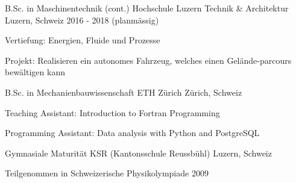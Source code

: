 

\begin{cventries}

\cventry
{B.Sc. in Maschinentechnik (cont.)} %
{Hochschule Luzern Technik \& Architektur} %
{Luzern, Schweiz} %
{2016 - 2018 (planmässig)} %
{
	\begin{cvitems} %
		\item {Vertiefung: Energien, Fluide und Prozesse}
		\item {Projekt: Realisieren ein autonomes Fahrzeug, welches einen Gelände-parcours bewältigen kann}
	\end{cvitems}
}


  \cventry
    {B.Sc. in Mechanienbauwissenschaft} %
    {ETH Zürich} %
    {Zürich, Schweiz} %
    {} %
    {
      \begin{cvitems} %
        \item {Teaching Assistant: Introduction to Fortran Programming}
        \item {Programming Assistant: Data analysis with Python and PostgreSQL}
      \end{cvitems}
    }

  \cventry
    {Gymnasiale Maturität} %
    {KSR (Kantonsschule Reussbühl)} %
    {Luzern, Schweiz} %
    {} %
    {
      \begin{cvitems} %
        \item {Teilgenommen in Schweizerische Physikolympiade 2009}
      \end{cvitems}
    }

\end{cventries}
